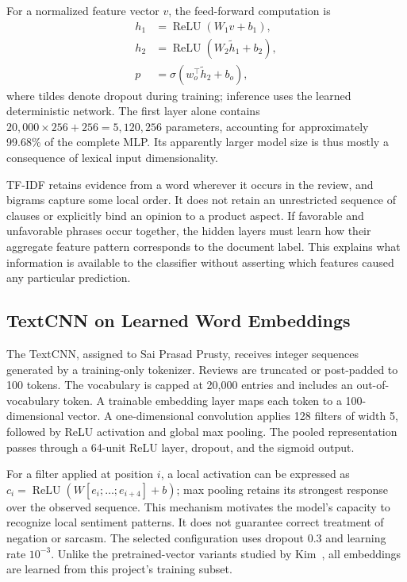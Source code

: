 For a normalized feature vector $v$, the feed-forward computation is
\begin{equation}
\begin{aligned}
h_1&=\operatorname{ReLU}(W_1v+b_1),\\
h_2&=\operatorname{ReLU}(W_2\widetilde h_1+b_2),\\
p&=\sigma(w_o^\top\widetilde h_2+b_o),
\end{aligned}
\end{equation}
where tildes denote dropout during training; inference uses the learned deterministic network. The first layer alone contains $20{,}000\times256+256=5{,}120{,}256$ parameters, accounting for approximately 99.68\% of the complete MLP. Its apparently larger model size is thus mostly a consequence of lexical input dimensionality.

TF-IDF retains evidence from a word wherever it occurs in the review, and bigrams capture some local order. It does not retain an unrestricted sequence of clauses or explicitly bind an opinion to a product aspect. If favorable and unfavorable phrases occur together, the hidden layers must learn how their aggregate feature pattern corresponds to the document label. This explains what information is available to the classifier without asserting which features caused any particular prediction.


\subsection{TextCNN on Learned Word Embeddings}
The TextCNN, assigned to Sai Prasad Prusty, receives integer sequences generated by a training-only tokenizer. Reviews are truncated or post-padded to 100 tokens. The vocabulary is capped at 20,000 entries and includes an out-of-vocabulary token. A trainable embedding layer maps each token to a 100-dimensional vector. A one-dimensional convolution applies 128 filters of width 5, followed by ReLU activation and global max pooling. The pooled representation passes through a 64-unit ReLU layer, dropout, and the sigmoid output.

For a filter applied at position $i$, a local activation can be expressed as $c_i=\operatorname{ReLU}(W[e_i;\ldots;e_{i+4}]+b)$; max pooling retains its strongest response over the observed sequence. This mechanism motivates the model's capacity to recognize local sentiment patterns. It does not guarantee correct treatment of negation or sarcasm. The selected configuration uses dropout 0.3 and learning rate $10^{-3}$. Unlike the pretrained-vector variants studied by Kim~\cite{kim2014}, all embeddings are learned from this project's training subset.


